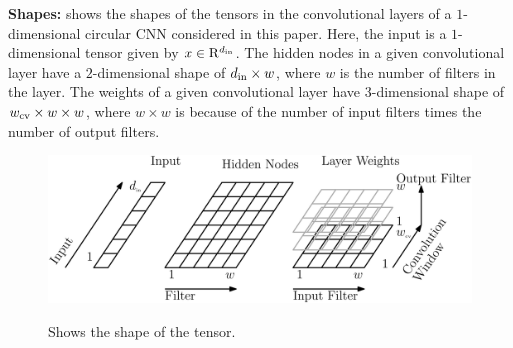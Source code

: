 \textbf{Shapes:}  shows the shapes of the tensors in the convolutional layers of a $1$-dimensional circular CNN considered in this paper. Here, the input is a $1$-dimensional tensor given by $x\in\mathrm{R}^{d_{\text{in}}}$. The hidden nodes in a given convolutional layer have a $2$-dimensional shape of $d_{\text{in}}\times w$, where $w$ is the number of filters in the layer. The weights of a given convolutional layer have $3$-dimensional shape of $w_{\text{cv}}\times w\times w$,  where $w\times w$ is because of the number of input filters times the number of output filters.
\FloatBarrier
\begin{figure}[h]
\centering
\includegraphics[scale=0.04]{figs/shape.png}
\label{fig:shape-main}
\caption{Shows the shape of the tensor.}
\end{figure}

